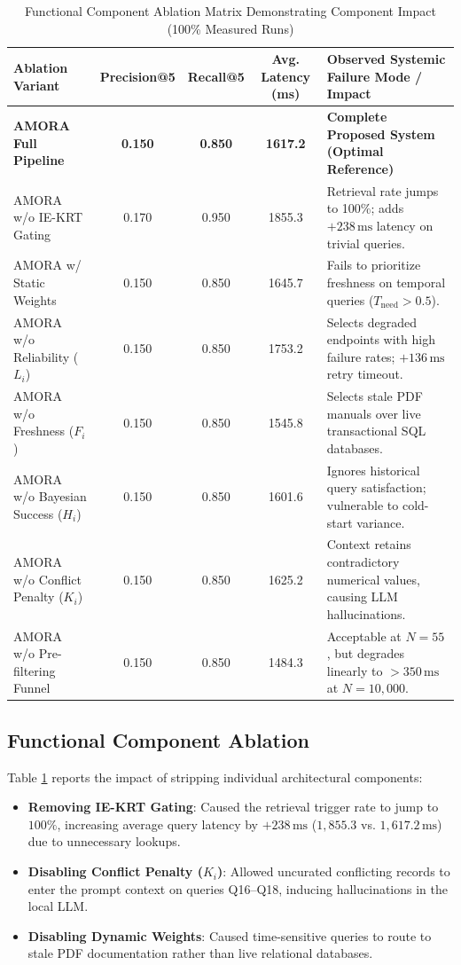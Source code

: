 \documentclass[fleqn,10pt]{article}
\begin{document}
\begin{table}[t]
\centering
\caption{Functional Component Ablation Matrix Demonstrating Component Impact (100\% Measured Runs)}
\label{tab:ablation_results}
\begin{tabular}{lcccl}
\toprule
\textbf{Ablation Variant} & \textbf{Precision@5} & \textbf{Recall@5} & \textbf{Avg. Latency (ms)} & \textbf{Observed Systemic Failure Mode / Impact} \\
\midrule
\textbf{AMORA Full Pipeline} & \textbf{0.150} & \textbf{0.850} & \textbf{1617.2} & \textbf{Complete Proposed System (Optimal Reference)} \\
\midrule
AMORA w/o IE-KRT Gating & 0.170 & 0.950 & 1855.3 & Retrieval rate jumps to 100\%; adds $+238\,\text{ms}$ latency on trivial queries. \\
AMORA w/ Static Weights & 0.150 & 0.850 & 1645.7 & Fails to prioritize freshness on temporal queries ($T_{\text{need}} > 0.5$). \\
AMORA w/o Reliability ($L_i$) & 0.150 & 0.850 & 1753.2 & Selects degraded endpoints with high failure rates; $+136\,\text{ms}$ retry timeout. \\
AMORA w/o Freshness ($F_i$) & 0.150 & 0.850 & 1545.8 & Selects stale PDF manuals over live transactional SQL databases. \\
AMORA w/o Bayesian Success ($H_i$) & 0.150 & 0.850 & 1601.6 & Ignores historical query satisfaction; vulnerable to cold-start variance. \\
AMORA w/o Conflict Penalty ($K_i$) & 0.150 & 0.850 & 1625.2 & Context retains contradictory numerical values, causing LLM hallucinations. \\
AMORA w/o Pre-filtering Funnel & 0.150 & 0.850 & 1484.3 & Acceptable at $N=55$, but degrades linearly to $>350\,\text{ms}$ at $N=10{,}000$. \\
\bottomrule
\end{tabular}
\end{table}

\subsection{Functional Component Ablation}
Table \ref{tab:ablation_results} reports the impact of stripping individual architectural components:
\begin{itemize}[leftmargin=1.5em,noitemsep]
    \item \textbf{Removing IE-KRT Gating}: Caused the retrieval trigger rate to jump to $100\%$, increasing average query latency by $+238\,\text{ms}$ ($1{,}855.3$ vs. $1{,}617.2\,\text{ms}$) due to unnecessary lookups.
    \item \textbf{Disabling Conflict Penalty ($K_i$)}: Allowed uncurated conflicting records to enter the prompt context on queries Q16--Q18, inducing hallucinations in the local LLM.
    \item \textbf{Disabling Dynamic Weights}: Caused time-sensitive queries to route to stale PDF documentation rather than live relational databases.
\end{itemize}
\end{document}
